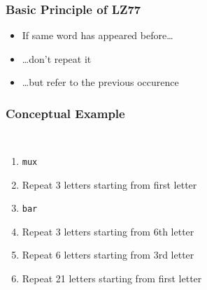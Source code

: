 \begin{frame}
  \frametitle{Basic Principle of LZ77}
  \begin{itemize}
    \item If same word has appeared before\dots
    \item \dots don't repeat it
    \item \dots but refer to the previous occurence
  \end{itemize}
\end{frame}

{
  \newcommand{\chunk}[3]{
    \draw[|-|] ($ (#1.south west) + (0,-0.1) $) -- ($ (#1.south east) + (0,-0.1) $);
    \draw[|->] ($ (#2.south west) + (0,-0.1) $) -- ($ (#2.south east) + (0,-0.1) $) node[midway,below,font=\tiny] {#3};
    \draw[-latex] ($ (#1.south) + (0,-0.1) $) -- ++(0,-0.5) -| ($ (#2.south west) + (0,-0.2) $);
  }
  \newcommand{\multichunk}[5]{
    \draw[|-|] ($ (#1.south west) + (0,-0.1) $) -- ($ (#2.south east) + (0,-0.1) $);
    \draw[|->] ($ (#3.south west) + (0,-0.1) $) -- ($ (#4.south east) + (0,-0.1) $) node[midway,below,font=\tiny] {#5};
    \draw[-latex] ($ (#1.south) ! 0.5 ! (#2.south) + (0,-0.1) $) -- ++(0,-0.5) -| ($ (#3.south west) + (0,-0.2) $);
  }
  \begin{frame}
    \frametitle{Conceptual Example}
    \begin{center} \tt
    \end{center}
    \vskip5mm
    \begin{enumerate}
      \item<2-> {\tt mux}
      \item<3-> Repeat 3 letters starting from first letter
      \item<4-> {\tt bar}
      \item<5-> Repeat 3 letters starting from 6th letter
      \item<6-> Repeat 6 letters starting from 3rd letter
      \item<7-> Repeat 21 letters starting from first letter
    \end{enumerate}
  \end{frame}
}

